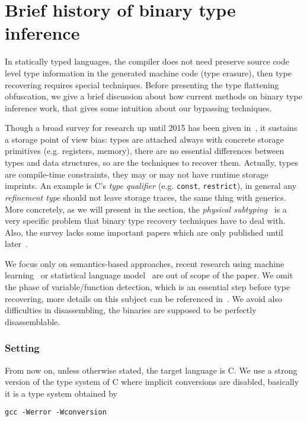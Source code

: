 \documentclass[compsoc,conference,a4paper,10pt,times]{IEEEtran}
\begin{document}
\section{Brief history of binary type inference}
\noindent
In statically typed languages, the compiler does not need preserve source code level type information in
the generated machine code (type erasure), then type recovering requires special techniques. Before
presenting the type flattening obfuscation, we give a brief discussion about how current methods on binary type
inference work, that gives some intuition about our bypassing techniques.

Though a broad survey for research
up until 2015 has been given in~\cite{caballero_type_2016}, it sustains a storage point of view bias: types are attached
always with concrete storage primitives (e.g. registers, memory), there are no essential differences between types and
data structures, so are the techniques to recover them. Actually, types are compile-time constraints, they
may or may not have runtime storage imprints. An example is C's \emph{type qualifier} (e.g.
\texttt{\small const}, \texttt{\small restrict}), in general any
\emph{refinement type} should not leave storage traces, the same thing with generics. More concretely, as
we will present in the section, the \emph{physical subtyping}~\cite{siff_coping_1999} is a very specific problem that binary type
recovery techniques have to deal with.
Also, the survey lacks some important
papers which are only published until later~\cite{noonan_polymorphic_2016,robbins_minx_2016}.

We focus only on semantics-based approaches, recent research using machine learning~\cite{maier_typeminer_2019}
or statistical language model~\cite{katz_estimating_2016} are out of scope of the paper.
We omit the phase of variable/function detection, which is an essential step before
type recovering, more details on this subject can be referenced in~\cite{balakrishnan_divine_2007}.
We avoid also difficulties in disassembling, the binaries are supposed to be perfectly disassemblable.

\subsubsection*{Setting} From now on, unless otherwise stated, the target language is C.
We use a strong version of the type system of C where implicit conversions are disabled, basically
it is a type system obtained by
\begin{center}
  \texttt{gcc -Werror -Wconversion}
\end{center}
\end{document}
